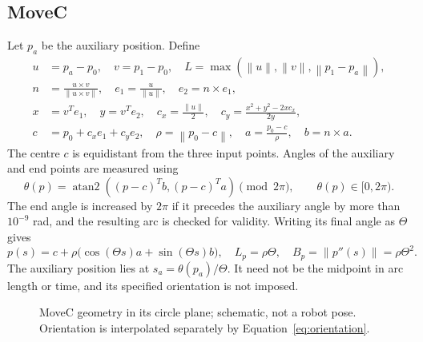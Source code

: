 \documentclass[11pt,a4paper]{report}
\newcommand{\atan}{\operatorname{atan2}}
\newcommand{\norm}[1]{\left\lVert#1\right\rVert}
\begin{document}
\subsection{MoveC}
Let $p_a$ be the auxiliary position. Define
\begin{align}
 u&=p_a-p_0,\quad v=p_1-p_0,\quad
 L=\max(\norm{u},\norm{v},\norm{p_1-p_a}),\\
 n&=\frac{u\times v}{\norm{u\times v}},\quad
 e_1=\frac{u}{\norm{u}},\quad e_2=n\times e_1,\\
 x&=v^Te_1,\quad y=v^Te_2,\quad
 c_x=\frac{\norm{u}}2,\quad
 c_y=\frac{x^2+y^2-2xc_x}{2y},\\
 c&=p_0+c_xe_1+c_ye_2,\quad
 \rho=\norm{p_0-c},\quad
 a=\frac{p_0-c}{\rho},\quad b=n\times a.
\end{align}
The centre $c$ is equidistant from the three input points. Angles of the
auxiliary and end points are measured using
\begin{equation}
 \theta(p)=\atan((p-c)^Tb,(p-c)^Ta)\pmod{2\pi},
 \qquad \theta(p)\in[0,2\pi).
\end{equation}
The end angle is increased by $2\pi$ if it precedes the auxiliary angle by
more than $10^{-9}$ rad, and the resulting arc is checked for validity.
Writing its final angle as $\Theta$ gives
\begin{equation}
 p(s)=c+\rho\bigl(\cos(\Theta s)a+\sin(\Theta s)b\bigr),\quad
 L_p=\rho\Theta,\quad B_p=\norm{p''(s)}=\rho\Theta^2.
 \label{eq:circle}
\end{equation}
The auxiliary position lies at $s_a=\theta(p_a)/\Theta$. It need not be the
midpoint in arc length or time, and its specified orientation is not imposed.

\begin{figure}[htbp]
\centering
{}
\caption{MoveC geometry in its circle plane; schematic, not a robot pose.
Orientation is interpolated separately by Equation~\eqref{eq:orientation}.}
\end{figure}
\end{document}
